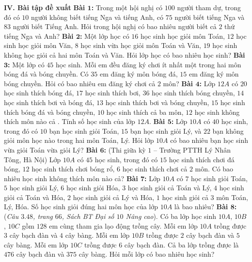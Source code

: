 \begin{multicols}{2}
	\textbf{\color{diendantoanhoc}IV. Bài tập đề xuất}
	\vskip 0.1cm
	\textbf{\color{diendantoanhoc}Bài $\pmb1$:} Trong một hội nghị có $100$ người tham dự, trong đó có $10$ người không biết tiếng Nga và tiếng Anh, có $75$ người biết tiếng Nga và $83$ người biết Tiếng Anh. Hỏi trong hội nghị có bao nhiêu người biết cả $2$ thứ tiếng Nga và Anh?
	\vskip 0.1cm
	\textbf{\color{diendantoanhoc}Bài $\pmb2$:} Một lớp học có $16$ học sinh học giỏi môn Toán, $12$ học sinh học giỏi môn Văn, $8$ học sinh vừa học giỏi môn Toán và Văn, $19$ học sinh không học giỏi cả hai môn Toán và Văn. Hỏi lớp học có bao nhiêu học sinh?
	\vskip 0.1cm
	\textbf{\color{diendantoanhoc}Bài $\pmb3$:} Một lớp có $45$ học sinh. Mỗi em đều đăng ký chơi ít nhất một trong hai môn bóng đá và bóng chuyền. Có $35$ em đăng ký môn bóng đá, $15$ em đăng ký môn bóng chuyền. Hỏi có bao nhiêu em đăng ký chơi cả $2$ môn?
	\vskip 0.1cm
	\textbf{\color{diendantoanhoc}Bài $\pmb4$:} Lớp $12A$ có $20$ học sinh thích bóng đá, $17$ học sinh thích bơi, $36$ học sinh thích bóng chuyền, $14$ học sinh thích bơi và bóng đá, $13$ học sinh thích bơi và bóng chuyền, $15$ học sinh thích bóng đá và bóng chuyền, $10$ học sinh thích cả ba môn, $12$ học sinh không thích môn nào cả . Tính số học sinh của lớp $12A$.
	\vskip 0.1cm
	\textbf{\color{diendantoanhoc}Bài $\pmb5$:} Lớp $10A$ có $40$ học sinh, trong đó có $10$ bạn học sinh giỏi Toán, $15$ bạn học sinh giỏi Lý, và $22$ bạn không giỏi môn học nào trong hai môn Toán, Lý. Hỏi lớp $10A$ có bao nhiêu bạn học sinh vừa giỏi Toán vừa giỏi Lý?
	\vskip 0.1cm
	\textbf{\color{diendantoanhoc}Bài $\pmb6$:} (Thi giữa kỳ $1$ -- Trường PTTH Lý Nhân Tông, Hà Nội) Lớp $10A$ có $45$ học sinh, trong đó có $15$ học sinh thích chơi đá bóng, $12$ học sinh thích chơi bóng rổ, $6$ học sinh thích chơi cả $2$ môn. Có bao nhiêu học sinh không thích môn nào cả?
	\vskip 0.1cm
	\textbf{\color{diendantoanhoc}Bài $\pmb7$:} Lớp $10A$ có $7$ học sinh giỏi Toán, $5$ học sinh giỏi Lý, $6$ học sinh giỏi Hóa, $3$ học sinh giỏi cả Toán và Lý, $4$ học sinh giỏi cả Toán và Hóa, $2$ học sinh giỏi cả Lý và Hóa, $1$ học sinh giỏi cả $3$ môn Toán, Lý, Hóa. Số học sinh giỏi đúng hai môn học của lớp $10A$ là bao nhiêu?
	\vskip 0.1cm
	\textbf{\color{diendantoanhoc}Bài $\pmb8$:} (\textit{Câu $3.48$, trang $66$, Sách BT Đại số $10$ Nâng cao}). Có ba lớp học sinh $10A$, $10B$, $10C$ gồm $128$ em cùng tham gia lạo động trồng cây. Mỗi em lớp $10A$ trồng được $3$ cây bạch đàn và $4$ cây bàng. Mỗi em lớp $10B$ trồng được $2$ cây bạch đàn và $5$ cây bàng. Mỗi em lớp $10C$ trồng được $6$ cây bạch đàn. Cả ba lớp trồng được là $476$ cây bạch đàn và $375$ cây bàng. Hỏi mỗi lớp có bao nhiêu học sinh?

\end{multicols}
